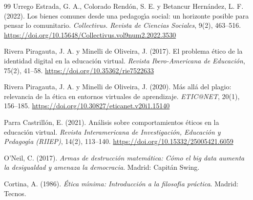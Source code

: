 \documentclass[12pt,letterpaper]{article}
\begin{document}
\begin{thebibliography}{99}
Urrego Estrada, G. A., Colorado Rend\'on, S. E. y Betancur Hern\'andez, L. F. (2022). Los bienes comunes desde una pedagog\'{\i}a social: un horizonte posible para pensar lo comunitario. \emph{Collectivus. Revista de Ciencias Sociales}, 9(2), 463--516. \url{https://doi.org/10.15648/Collectivus.vol9num2.2022.3530}

Rivera Piragauta, J. A. y Minelli de Oliveira, J. (2017). El problema \'etico de la identidad digital en la educaci\'on virtual. \emph{Revista Ibero-Americana de Educaci\'on}, 75(2), 41--58. \url{https://doi.org/10.35362/rie7522633}

Rivera Piragauta, J. A. y Minelli de Oliveira, J. (2020). M\'as all\'a del plagio: relevancia de la \'etica en entornos virtuales de aprendizaje. \emph{ETIC@NET}, 20(1), 156--185. \url{https://doi.org/10.30827/eticanet.v20i1.15140}

Parra Castrill\'on, E. (2021). An\'alisis sobre comportamientos \'eticos en la educaci\'on virtual. \emph{Revista Interamericana de Investigaci\'on, Educaci\'on y Pedagog\'{\i}a (RIIEP)}, 14(2), 113--140. \url{https://doi.org/10.15332/25005421.6059}

O'Neil, C. (2017). \emph{Armas de destrucci\'on matem\'atica: C\'omo el big data aumenta la desigualdad y amenaza la democracia}. Madrid: Capit\'an Swing.

Cortina, A. (1986). \emph{\'Etica m\'{\i}nima: Introducci\'on a la filosof\'{\i}a pr\'actica}. Madrid: Tecnos.

\end{thebibliography}
\end{document}
